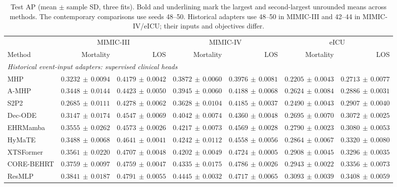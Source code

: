 \begin{table}[tp]
\centering\footnotesize
\setlength{\tabcolsep}{3pt}
\caption{Test AP (mean $\pm$ sample SD, three fits). Bold and underlining mark the largest and second-largest unrounded means across methods. The contemporary comparisons use seeds 48--50. Historical adapters use 48--50 in MIMIC-III and 42--44 in MIMIC-IV/eICU; their inputs and objectives differ.}
\label{tab:primary}
\begin{tabular}{lrrrrrr}
\toprule
& \multicolumn{2}{c}{MIMIC-III} & \multicolumn{2}{c}{MIMIC-IV} & \multicolumn{2}{c}{eICU} \\
\cmidrule(lr){2-3}\cmidrule(lr){4-5}\cmidrule(lr){6-7}
Method & Mortality & LOS & Mortality & LOS & Mortality & LOS \\
\midrule
\multicolumn{7}{l}{\textit{Historical event-input adapters: supervised clinical heads}} \\
MHP & $0.3232\,\pm\,0.0094$ & $0.4179\,\pm\,0.0042$ & $0.3872\,\pm\,0.0060$ & $0.3976\,\pm\,0.0081$ & $0.2205\,\pm\,0.0043$ & $0.2713\,\pm\,0.0077$ \\
A-MHP & $0.3448\,\pm\,0.0144$ & $0.4423\,\pm\,0.0050$ & $0.3945\,\pm\,0.0060$ & $0.4188\,\pm\,0.0068$ & $0.2624\,\pm\,0.0084$ & $0.2886\,\pm\,0.0031$ \\
S2P2 & $0.2685\,\pm\,0.0111$ & $0.4278\,\pm\,0.0062$ & $0.3628\,\pm\,0.0104$ & $0.4185\,\pm\,0.0037$ & $0.2490\,\pm\,0.0043$ & $0.2907\,\pm\,0.0040$ \\
Dec-ODE & $0.3147\,\pm\,0.0174$ & $0.4547\,\pm\,0.0069$ & $0.4042\,\pm\,0.0074$ & $0.4360\,\pm\,0.0048$ & $0.2695\,\pm\,0.0070$ & $0.3072\,\pm\,0.0025$ \\
EHRMamba & $0.3555\,\pm\,0.0262$ & $0.4573\,\pm\,0.0026$ & $0.4217\,\pm\,0.0073$ & $0.4569\,\pm\,0.0028$ & $0.2790\,\pm\,0.0023$ & $0.3080\,\pm\,0.0053$ \\
HyMaTE & $0.3488\,\pm\,0.0068$ & $0.4641\,\pm\,0.0041$ & $0.4242\,\pm\,0.0112$ & $0.4558\,\pm\,0.0056$ & $0.2864\,\pm\,0.0067$ & $0.3320\,\pm\,0.0080$ \\
XTSFormer & $0.3561\,\pm\,0.0220$ & $0.4707\,\pm\,0.0048$ & $0.4202\,\pm\,0.0049$ & $0.4724\,\pm\,0.0005$ & $0.2908\,\pm\,0.0045$ & $0.3296\,\pm\,0.0035$ \\
CORE-BEHRT & $0.3759\,\pm\,0.0097$ & $0.4759\,\pm\,0.0047$ & $0.4335\,\pm\,0.0175$ & $0.4786\,\pm\,0.0026$ & $0.2943\,\pm\,0.0022$ & $0.3356\,\pm\,0.0073$ \\
ResMLP & $0.3841\,\pm\,0.0187$ & $0.4791\,\pm\,0.0055$ & $0.4445\,\pm\,0.0032$ & $0.4717\,\pm\,0.0065$ & $0.3093\,\pm\,0.0039$ & $0.3408\,\pm\,0.0059$ \\

\end{tabular}
\end{table}
